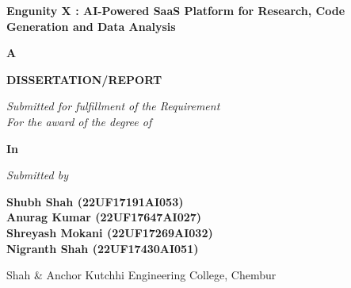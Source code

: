 \thispagestyle{empty}
\begin{center}

\vspace*{0.5cm}

{\large \bfseries Engunity X : AI-Powered SaaS Platform for Research, Code Generation and Data Analysis \par}

\vspace{1.2\baselineskip}

{\large \textbf{A} \par}

\vspace{0.4\baselineskip}

{\Large \textbf{DISSERTATION/REPORT} \par}

\vspace{0.6\baselineskip}

{\textit{Submitted for fulfillment of the Requirement} \\[2pt]
\textit{For the award of the degree of}}\par

\vspace{0.8\baselineskip}

{\large \bf \mydegree \par}

\vspace{0.4\baselineskip}

{\large \textbf{In} \par}

\vspace{0.4\baselineskip}

{\large \bf \branch \par}

\vspace{0.8\baselineskip}

{\textit{Submitted by} \par}

\vspace{0.6\baselineskip}

\textbf{Shubh Shah (22UF17191AI053)} \\
\textbf{Anurag Kumar (22UF17647AI027)} \\
\textbf{Shreyash Mokani (22UF17269AI032)} \\
\textbf{Nigranth Shah (22UF17430AI051)}

\vspace{0.8\baselineskip}

Shah \& Anchor Kutchhi Engineering College, Chembur


\end{center}

